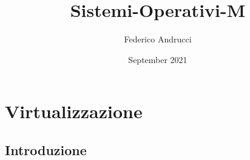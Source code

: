 \documentclass[a4paper, 11pt, twoside, openright]{book}
\title{Sistemi-Operativi-M}
\author{Federico Andrucci}
\date{September 2021}
\begin{document}
\maketitle
\tableofcontents

\chapter{Virtualizzazione}
\section{Introduzione}
\end{document}
